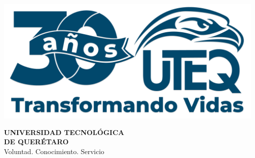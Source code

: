 \documentclass[oneside,12pt]{book}
\begin{document}
	\pagestyle{empty}
	
	\renewcommand\chaptername{UNIDAD}
	
	\frontmatter
	
	
	\begin{titlepage}
		\begin{center}
			
			
			\vspace{0.6cm}
			
			\begin{minipage}{0.3\textwidth}
				\includegraphics[width=\textwidth]{Figuras/LogoUTEQ}
			\end{minipage}
			\hfill
			\begin{minipage}{0.65\textwidth}
				\raggedleft
				{\fontsize{18}{22}\selectfont\textcolor{uteqDarkBlue}{\textbf{UNIVERSIDAD TECNOLÓGICA}}} \\
				{\fontsize{18}{22}\selectfont\textcolor{uteqDarkBlue}{\textbf{DE QUERÉTARO}}} \\
				\vspace{0.1cm}
				{\fontsize{9}{11}\selectfont\textcolor{uteqGreen}{Voluntad. Conocimiento. Servicio}}
			\end{minipage}
			
			\vspace{2.5cm}
			

\end{center}
\end{titlepage}
\end{document}
